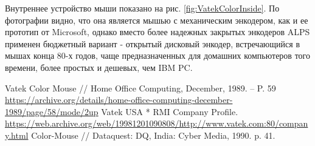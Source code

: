 \documentclass[11pt, a4paper]{article}
\begin{document}
Внутреннее устройство мыши показано на рис. \ref{fig:VatekColorInside}. По фотографии видно, что она является мышью с механическим энкодером, как и ее прототип от Microsoft, однако вместо более надежных закрытых энкодеров ALPS применен бюджетный вариант - открытый дисковый энкодер, встречающийся в мышах конца 80-х годов, чаще предназначенных для домашних компьютеров того времени, более простых и дешевых, чем IBM PC.

\begin{thebibliography}{9}
 Vatek Color Mouse // Home Office Computing, December, 1989. -- P. 59 \url{https://archive.org/details/home-office-computing-december-1989/page/58/mode/2up}
 Vatek USA * RMI Company Profile. \url{https://web.archive.org/web/19981201090808/http://www.vatek.com:80/company.html}
 Color-Mouse // Dataquest: DQ, India: Cyber Media, 1990. p. 41.
\end{thebibliography}
\end{document}
